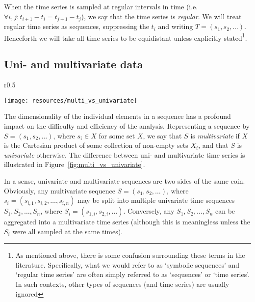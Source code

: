 When the time series is sampled at regular intervals in time (i.e.\ $\forall i, j: t_{i+1} - t_i = t_{j+1} - t_j$), we say that the time series is \emph{regular}. We will treat regular time series as sequences, suppressing the $t_i$ and writing $T = (s_1, s_2, \dots)$. Henceforth we will take all time series to be equidistant unless explicitly stated\footnote{As mentioned above, there is some confusion surrounding these terms in the literature. Specifically, what we would refer to as `symbolic sequences' and `regular time series' are often simply referred to as `sequences' or `time series'. In such contexts, other types of sequences (and time series) are usually ignored}.

\subsection{Uni- and multivariate data}
\label{sect:unimultivariate}

\begin{wrapfigure}{r}{0.5\textwidth}
    \vspace{-25pt}
    \begin{center}
        \leavevmode
        \texttt{[image: resources/multi\_vs\_univariate]}
    \end{center}
    \vspace{-15pt}
    \caption{{\small Two sine curves regarded as two separate univariate time series (dotted lines) and as one multivariate time series (solid lines).}}
\label{fig:multi_vs_univariate}
    \vspace{-25pt}
\end{wrapfigure}

The dimensionality of the individual elements in a sequence has a profound impact on the difficulty and efficiency of the analysis. Representing a sequence by $S = (s_1, s_2, \dots)$, where $s_i \in X$ for some set $X$, we say that $S$ is \emph{multivariate} if $X$ is the Cartesian product of some collection of non-empty sets $X_i$, and that $S$ is \emph{univariate} otherwise. The difference between uni- and multivariate time series is illustrated in Figure~\ref{fig:multi_vs_univariate}.

In a sense, univariate and multivariate sequences are two sides of the same coin. Obviously, any multivariate sequence $S = (s_1, s_2, \dots)$, where $s_i = (s_{i,1}, s_{i,2}, \dots, s_{i,n})$ may be split into multiple univariate time sequences $S_1, S_2, \dots, S_n$, where $S_i = (s_{1,i}, s_{2, i}, \dots )$. Conversely, any $S_1, S_2, \dots, S_n$ can be aggregated into a multivariate time series (although this is meaningless unless the $S_i$ were all sampled at the same times).

